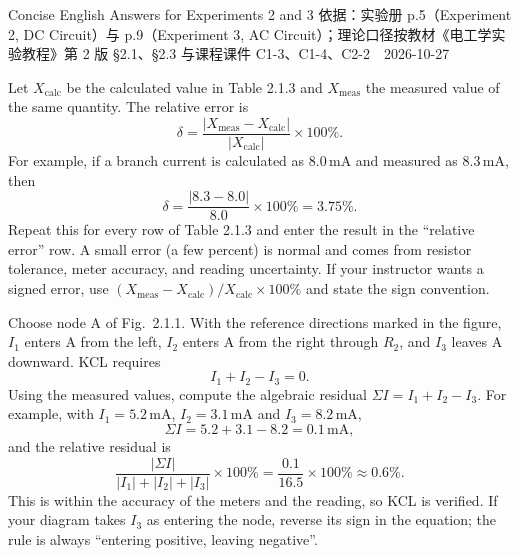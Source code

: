 \documentclass[11pt]{ctexart}
\begin{document}
{Concise English Answers for Experiments 2 and 3}
{依据：实验册 p.5（Experiment 2, DC Circuit）与 p.9（Experiment 3, AC Circuit）；理论口径按教材《电工学实验教程》第 2 版 §2.1、§2.3 与课程课件 C1-3、C1-4、C2-2\ \textperiodcentered\ 2026-10-27}



Let \(X_{\mathrm{calc}}\) be the calculated value in Table 2.1.3 and \(X_{\mathrm{meas}}\) the measured value of the same quantity. The relative error is
\[
\delta=\frac{|X_{\mathrm{meas}}-X_{\mathrm{calc}}|}{|X_{\mathrm{calc}}|}\times 100\% .
\]
For example, if a branch current is calculated as \(8.0\,\mathrm{mA}\) and measured as \(8.3\,\mathrm{mA}\), then
\[
\delta=\frac{|8.3-8.0|}{8.0}\times 100\%=3.75\% .
\]
Repeat this for every row of Table 2.1.3 and enter the result in the ``relative error'' row. A small error (a few percent) is normal and comes from resistor tolerance, meter accuracy, and reading uncertainty. If your instructor wants a signed error, use \((X_{\mathrm{meas}}-X_{\mathrm{calc}})/X_{\mathrm{calc}}\times100\%\) and state the sign convention.

Choose node A of Fig.~2.1.1. With the reference directions marked in the figure, \(I_1\) enters A from the left, \(I_2\) enters A from the right through \(R_2\), and \(I_3\) leaves A downward. KCL requires
\[
I_1+I_2-I_3=0 .
\]
Using the measured values, compute the algebraic residual \(\Sigma I=I_1+I_2-I_3\). For example, with \(I_1=5.2\,\mathrm{mA}\), \(I_2=3.1\,\mathrm{mA}\) and \(I_3=8.2\,\mathrm{mA}\),
\[
\Sigma I=5.2+3.1-8.2=0.1\,\mathrm{mA},
\]
and the relative residual is
\[
\frac{|\Sigma I|}{|I_1|+|I_2|+|I_3|}\times100\%
=\frac{0.1}{16.5}\times100\%\approx0.6\% .
\]
This is within the accuracy of the meters and the reading, so KCL is verified. If your diagram takes \(I_3\) as entering the node, reverse its sign in the equation; the rule is always ``entering positive, leaving negative''.
\end{document}
